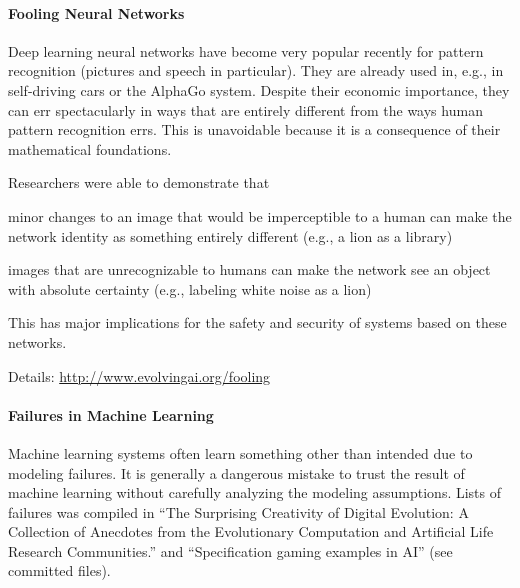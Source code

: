 \paragraph{Fooling Neural Networks}
Deep learning neural networks have become very popular recently for pattern recognition (pictures and speech in particular).
They are already used in, e.g., in self-driving cars or the AlphaGo system.
Despite their economic importance, they can err spectacularly in ways that are entirely different from the ways human pattern recognition errs.
This is unavoidable because it is a consequence of their mathematical foundations.

Researchers were able to demonstrate that
\begin{compactitem}
 \item minor changes to an image that would be imperceptible to a human can make the network identity as something entirely different (e.g., a lion as a library)
 \item images that are unrecognizable to humans can make the network see an object with absolute certainty (e.g., labeling white noise as a lion)
\end{compactitem}
This has major implications for the safety and security of systems based on these networks.

Details: \url{http://www.evolvingai.org/fooling}

\paragraph{Failures in Machine Learning}
Machine learning systems often learn something other than intended due to modeling failures.
It is generally a dangerous mistake to trust the result of machine learning without carefully analyzing the modeling assumptions.
Lists of failures was compiled in ``The Surprising Creativity of Digital Evolution: A Collection of Anecdotes
from the Evolutionary Computation and Artificial Life Research Communities.'' and ``Specification gaming examples in AI'' (see committed files).

